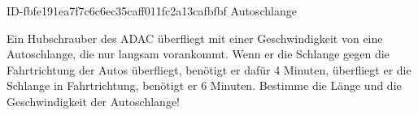 \begin{exercise}
      {ID-fbfe191ea7f7c6c6ec35caff011fc2a13cafbfbf}
      {Autoschlange}
  \ifproblem\problem\par
    Ein Hubschrauber des ADAC überfliegt mit einer Geschwindigkeit von 
    eine Autoschlange, die nur langsam vorankommt. Wenn er die Schlange gegen die
    Fahrtrichtung der Autos überfliegt, benötigt er dafür 4 Minuten, überfliegt er
    die Schlange in Fahrtrichtung, benötigt er 6 Minuten. Bestimme die Länge und
    die Geschwindigkeit der Autoschlange!
  \fi
\end{exercise}
